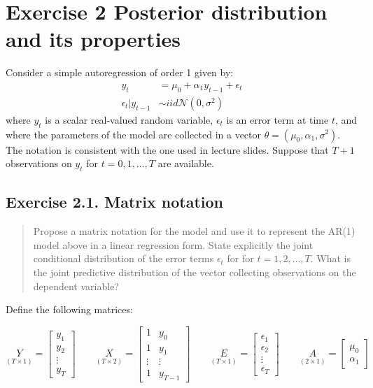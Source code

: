 \documentclass[
  letterpaper,
  DIV=11,
  numbers=noendperiod]{scrreprt}
\begin{document}
\hypertarget{exercise-2-posterior-distribution-and-its-properties}{%
\section*{Exercise 2 Posterior distribution and its
properties}\label{exercise-2-posterior-distribution-and-its-properties}}

Consider a simple autoregression of order 1 given by: \begin{align}
y_t &= \mu_0 + \alpha_1 y_{t-1} +  \epsilon_t\\
\epsilon_t|y_{t-1} &\sim iid\mathcal{N}\left(0,\sigma^2\right)
\end{align} where \(y_t\) is a scalar real-valued random variable,
\(\epsilon_t\) is an error term at time \(t\), and where the parameters
of the model are collected in a vector
\(\theta=(\mu_0, \alpha_1, \sigma^2)\). The notation is consistent with
the one used in lecture slides. Suppose that \(T+1\) observations on
\(y_t\) for \(t=0,1,\dots,T\) are available.

\hypertarget{exercise-2.1.-matrix-notation}{%
\subsection*{Exercise 2.1. Matrix
notation}\label{exercise-2.1.-matrix-notation}}

\begin{quote}
Propose a matrix notation for the model and use it to represent the
AR(1) model above in a linear regression form. State explicitly the
joint conditional distribution of the error terms \(\epsilon_t\) for for
\(t=1,2,\dots,T\). What is the joint predictive distribution of the
vector collecting observations on the dependent variable?
\end{quote}

Define the following matrices:

\[
\underset{(T\times 1)}{Y} = \begin{bmatrix} y_1\\y_2\\ \vdots \\y_T \end{bmatrix}\qquad 
\underset{(T\times 2)}{X} = \begin{bmatrix} 1 & y_0\\ 1& y_1\\ \vdots&\vdots \\1&y_{T-1} \end{bmatrix}\qquad
\underset{(T\times 1)}{E} = \begin{bmatrix} \epsilon_1\\ \epsilon_2\\ \vdots \\ \epsilon_T \end{bmatrix}\qquad 
\underset{(2\times 1)}{A} = \begin{bmatrix} \mu_0 \\ \alpha_1 \end{bmatrix}
\]
\end{document}
